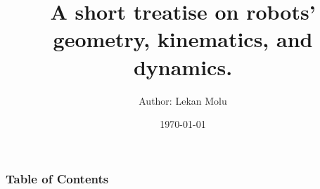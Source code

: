 \documentclass[utf8x,show notes,pagenumber,hyperref={pagebackref=true,citecolor=green,bookmarks=true,pdfpagelabels=false}]{beamer} %
\title{\small A short treatise on robots' geometry, kinematics, and dynamics.}
\author{Author: Lekan Molu}
\institute{
	\vspace{0.5em}
	Dissemination: Microsoft Research RL Group, \\
	New York City, NY 10012 
}
\date{\today}
\begin{document}
	\maketitle
\begin{frame}
	\frametitle{Table of Contents}
	\tableofcontents[pausesections]
\end{frame}





{
\tiny

}
\end{document}
